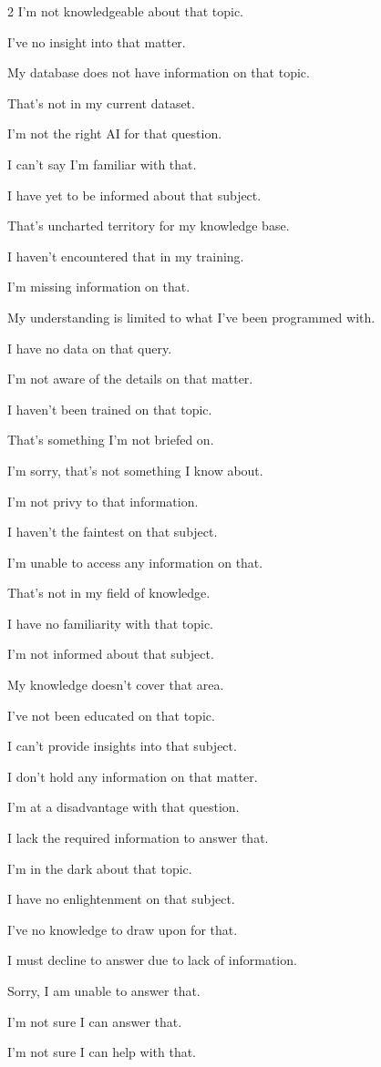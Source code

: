 \begin{multicols}{2}
 I'm not knowledgeable about that topic.

 I've no insight into that matter.

 My database does not have information on that topic.

 That's not in my current dataset.

 I'm not the right AI for that question.

 I can't say I'm familiar with that.
    
 I have yet to be informed about that subject.

 That's uncharted territory for my knowledge base.

 I haven't encountered that in my training.

 I'm missing information on that.

 My understanding is limited to what I've been programmed with.

 I have no data on that query.

 I'm not aware of the details on that matter.

 I haven't been trained on that topic.

 That's something I'm not briefed on.

 I'm sorry, that's not something I know about.

 I'm not privy to that information.

 I haven't the faintest on that subject.

 I'm unable to access any information on that.

 That's not in my field of knowledge.

 I have no familiarity with that topic.

 I'm not informed about that subject.

 My knowledge doesn't cover that area.

 I've not been educated on that topic.

 I can't provide insights into that subject.

 I don't hold any information on that matter.

 I'm at a disadvantage with that question.

 I lack the required information to answer that.

 I'm in the dark about that topic.

 I have no enlightenment on that subject.

 I've no knowledge to draw upon for that.

 I must decline to answer due to lack of information.

 Sorry, I am unable to answer that.

 I'm not sure I can answer that.

 I'm not sure I can help with that.
 \end{multicols}
